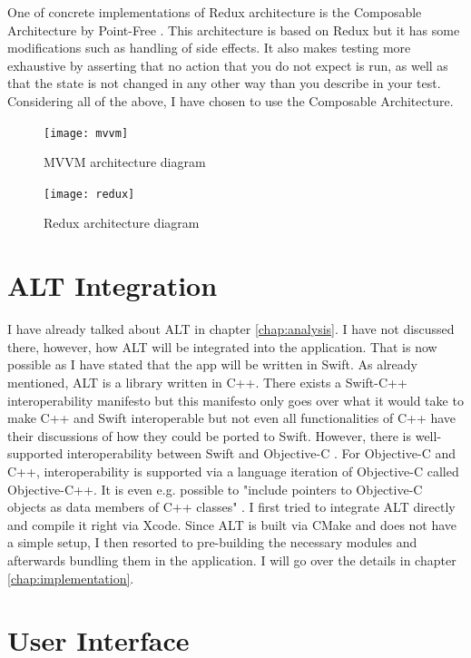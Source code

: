 One of concrete implementations of Redux architecture is the Composable Architecture by Point-Free \cite{tca}. This architecture is based on Redux but it has some modifications such as handling of side effects. It also makes testing more exhaustive by asserting that no action that you do not expect is run, as well as that the state is not changed in any other way than you describe in your test. Considering all of the above, I have chosen to use the Composable Architecture. 

\begin{figure}
    \texttt{[image: mvvm]}
    \caption{MVVM architecture diagram \cite{mvvm}}\label{mvvm}
\end{figure}

\begin{figure}
    \texttt{[image: redux]}
    \caption{Redux architecture diagram \cite{react-redux}}\label{redux}
\end{figure}

\section{ALT Integration}

I have already talked about ALT in chapter \ref{chap:analysis}. I have not discussed there, however, how ALT will be integrated into the application. That is now possible as I have stated that the app will be written in Swift. As already mentioned, ALT is a library written in C++. There exists a Swift-C++ interoperability manifesto \cite{swift-c++-manifesto} but this manifesto only goes over what it would take to make C++ and Swift interoperable but not even all functionalities of C++ have their discussions of how they could be ported to Swift. However, there is well-supported interoperability between Swift and Objective-C \cite{swift-objc-interoperability}. For Objective-C and C++, interoperability is supported via a language iteration of Objective-C called Objective-C++. It is even e.g. possible to "include pointers to Objective-C objects as data members of C++ classes" \cite{objc++}. I first tried to integrate ALT directly and compile it right via Xcode. Since ALT is built via CMake \cite{cmake} and does not have a simple setup, I then resorted to pre-building the necessary modules and afterwards bundling them in the application. I will go over the details in chapter \ref{chap:implementation}.

\section{User Interface}

